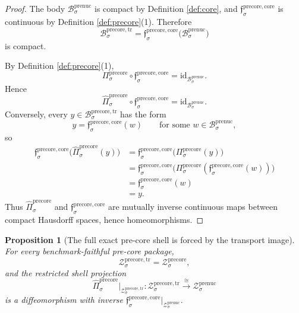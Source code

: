 \documentclass[11pt]{article}
\newcommand{\PreNucBody}[1]{\mathcal B_{#1}^{\mathrm{prenuc}}}
\newcommand{\PreNucShellSet}[1]{\mathcal Z_{#1}^{\mathrm{prenuc}}}
\newcommand{\PreCoreProj}[1]{\Pi_{#1}^{\mathrm{precore}}}
\newcommand{\PreCoreCoreMin}[1]{\mathfrak f_{#1}^{\mathrm{precore,core}}}
\newcommand{\PreCoreShellSet}[1]{\mathcal Z_{#1}^{\mathrm{precore}}}
\newcommand{\PreCoreTrBody}[1]{\mathcal B_{#1}^{\mathrm{precore,tr}}}
\newcommand{\PreCoreTrProj}[1]{\widehat{\Pi}_{#1}^{\mathrm{precore}}}
\newcommand{\PreCoreTrShell}[1]{\mathcal Z_{#1}^{\mathrm{precore,tr}}}
\newtheorem{proposition}{Proposition}
\begin{document}
\begin{proof}
The body \(\PreNucBody{\sigma}\) is compact by Definition \ref{def:core}, and \(\PreCoreCoreMin{\sigma}\) is continuous by Definition \ref{def:precore}(1). Therefore
\[
\PreCoreTrBody{\sigma}
=
\PreCoreCoreMin{\sigma}\bigl(\PreNucBody{\sigma}\bigr)
\]
is compact.

By Definition \ref{def:precore}(1),
\[
\PreCoreProj{\sigma}\circ\PreCoreCoreMin{\sigma}
=
\mathrm{id}_{\PreNucBody{\sigma}}.
\]
Hence
\[
\PreCoreTrProj{\sigma}\circ\PreCoreCoreMin{\sigma}
=
\mathrm{id}_{\PreNucBody{\sigma}}.
\]
Conversely, every \(y\in\PreCoreTrBody{\sigma}\) has the form
\[
y=\PreCoreCoreMin{\sigma}(w)
\qquad
\text{for some }
w\in\PreNucBody{\sigma},
\]
so
\begin{align*}
\PreCoreCoreMin{\sigma}\bigl(\PreCoreTrProj{\sigma}(y)\bigr)
&=
\PreCoreCoreMin{\sigma}\bigl(\PreCoreProj{\sigma}(y)\bigr) \\
&=
\PreCoreCoreMin{\sigma}\bigl(\PreCoreProj{\sigma}(\PreCoreCoreMin{\sigma}(w))\bigr) \\
&=
\PreCoreCoreMin{\sigma}(w) \\
&=
y.
\end{align*}
Thus \(\PreCoreTrProj{\sigma}\) and \(\PreCoreCoreMin{\sigma}\) are mutually inverse continuous maps between compact Hausdorff spaces, hence homeomorphisms.
\end{proof}

\begin{proposition}[The full exact pre-core shell is forced by the transport image]
\label{prop:shell}
For every benchmark-faithful pre-core package,
\[
\PreCoreTrShell{\sigma}
=
\PreCoreShellSet{\sigma},
\]
and the restricted shell projection
\[
\PreCoreTrProj{\sigma}\big|_{\PreCoreTrShell{\sigma}}
:
\PreCoreTrShell{\sigma}\xrightarrow{\cong}\PreNucShellSet{\sigma}
\]
is a diffeomorphism with inverse \(\PreCoreCoreMin{\sigma}\big|_{\PreNucShellSet{\sigma}}\).
\end{proposition}
\end{document}
